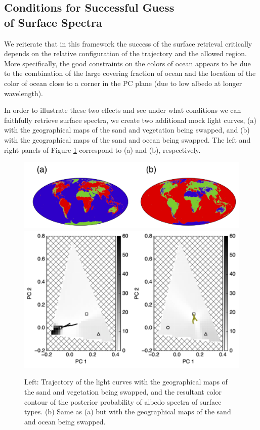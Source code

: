 \documentclass[iop,numberedappendix,apj]{emulateapj}
\begin{document}
\subsection{Conditions for Successful Guess\\of Surface Spectra}
\label{ss:guess}

We reiterate that in this framework the success of the surface retrieval critically depends on the relative configuration of the trajectory and the allowed region. 
More specifically, the good constraints on the colors of ocean appears to be due to the combination of the large covering fraction of ocean and the location of the color of ocean close to a corner in the PC plane (due to low albedo at longer wavelength). 

In order to illustrate these two effects and see under what conditions we can faithfully retrieve surface spectra, we create two additional mock light curves, (a) with the geographical maps of the sand and vegetation being swapped, and  (b) with the geographical maps of the sand and ocean being swapped. 
The left and right panels of Figure \ref{fig:swap} correspond to (a) and (b), respectively. 

\begin{figure}[htb!]
    \begin{center}
    \includegraphics[width=\hsize]{swap_map.pdf}
    \includegraphics[width=\hsize]{mockdata_90deg_3types23_t360_lc_noreg_allowedregion_gray.pdf}
    \end{center}
    \caption{Left: Trajectory of the light curves with the geographical maps of the sand and vegetation being swapped, and the resultant color contour of the posterior probability of albedo spectra of surface types. (b) Same as (a) but with the geographical maps of the sand and ocean being swapped.}
\label{fig:swap}
\end{figure}
\end{document}
